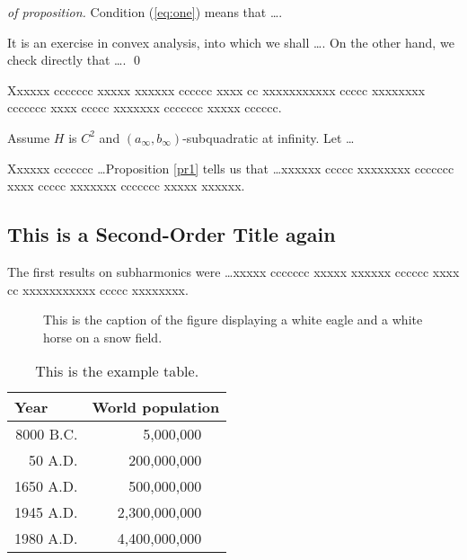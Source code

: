 \documentclass[citeauthoryear]{GTM2020}
\begin{document}
\begin{proof}[of proposition]
Condition (\ref{eq:one}) means that \dots .

It is an exercise in convex analysis, into which we shall \dots .
On the other hand, we check directly that \dots .
\qed
\end{proof}

Xxxxxx ccccccc xxxxx xxxxxx cccccc xxxx cc xxxxxxxxxxx
ccccc xxxxxxxx ccccccc xxxx ccccc xxxxxxx ccccccc xxxxx cccccc.

\begin{corollary}
Assume $H$ is $C^{2}$ and
$\left(a_{\infty}, b_{\infty}\right)$-subquadratic
at infinity. Let \dots
\end{corollary}

Xxxxxx ccccccc \dots Proposition \ref{pr1} tells us that \dots xxxxxx
ccccc xxxxxxxx ccccccc xxxx ccccc xxxxxxx ccccccc xxxxx xxxxxx.

\subsection{This is a Second-Order Title again}

The first results on subharmonics were \dots xxxxx ccccccc
xxxxx xxxxxx cccccc xxxx cc xxxxxxxxxxx ccccc xxxxxxxx.

\begin{figure}[!h]
\vspace{1.5cm}
\caption{This is the caption of the figure displaying a white eagle and
a white horse on a snow field.}
\end{figure}


\begin{table}[h]
\caption{This is the example table.}
\begin{center}
\begin{tabular}{r@{\quad}rl}
\hline
\multicolumn{1}{l}{\rule{0pt}{12pt}
       Year}&\multicolumn{2}{l}{World population}\\ [2pt]
\hline\rule{0pt}{12pt}
8000 B.C.  &     5,000,000& \\
  50 A.D.  &   200,000,000& \\
1650 A.D.  &   500,000,000& \\
1945 A.D.  & 2,300,000,000& \\
1980 A.D.  & 4,400,000,000& \\[2pt]
\hline
\end{tabular}
\end{center}
\end{table}
\end{document}
